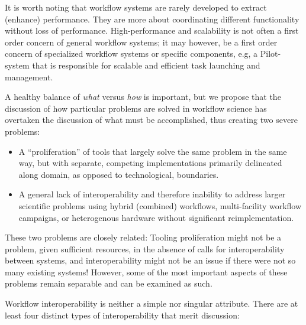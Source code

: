 It is worth noting that workflow systems are rarely developed to extract
(enhance) performance. They are more about coordinating different
functionality without loss of performance. High-performance and scalability is
not often a first order concern of general workflow systems; it may however,
be a first order concern of specialized workflow systems or specific
components, e.g, a Pilot-system that is responsible for scalable and efficient task launching and management.

A healthy balance of \textit{what} versus \textit{how} is
important, but we propose that the discussion of how particular problems are
solved in workflow science has overtaken the discussion of what must be
accomplished, thus creating two severe problems: \begin{itemize} \item A
``proliferation'' of tools that largely solve the same problem in the same way,
but with separate, competing implementations primarily delineated along domain,
as opposed to technological, boundaries.  \item A general lack of
interoperability and therefore inability to address larger scientific problems
using hybrid (combined) workflows, multi-facility workflow campaigns, or
heterogenous hardware without significant reimplementation.  \end{itemize}

These two problems are closely related: Tooling proliferation might not be a
problem, given sufficient resources, in the absence of calls for
interoperability between systems, and interoperability might not be an issue if
there were not so many existing systems! However, some of the most important
aspects of these problems remain separable and can be examined as such.

Workflow interoperability is neither a simple nor singular attribute. There
are at least four distinct types of interoperability that merit discussion:

